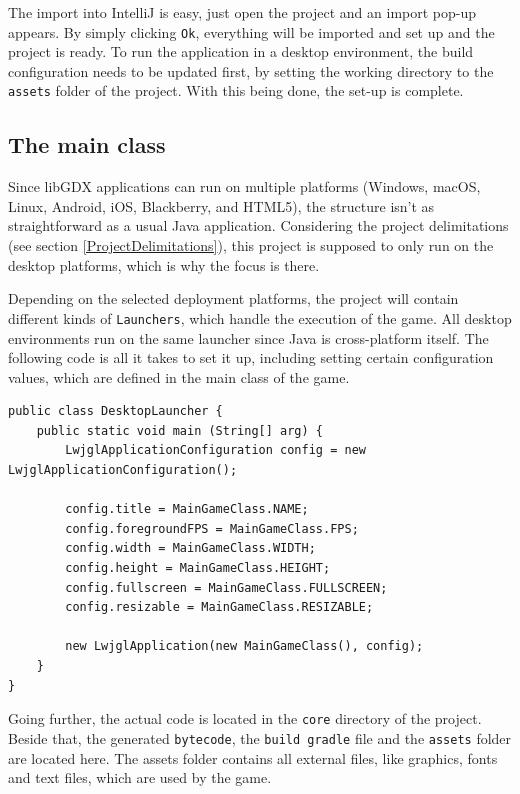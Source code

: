 \documentclass[12p]{article}
\begin{document}
The import into IntelliJ is easy, just open the project and an import pop-up appears. By simply clicking \texttt{Ok}, everything will be imported and set up and the project is ready. To run the application in a desktop environment, the build configuration needs to be updated first, by setting the working directory to the \texttt{assets} folder of the project. With this being done, the set-up is complete.


\subsection{The main class} \label{DocMainClass}

Since libGDX applications can run on multiple platforms (Windows, macOS, Linux, Android, iOS, Blackberry, and HTML5), the structure isn't as straightforward as a usual Java application. Considering the project delimitations (see section \ref{ProjectDelimitations}), this project is supposed to only run on the desktop platforms, which is why the focus is there.

Depending on the selected deployment platforms, the project will contain different kinds of \texttt{Launchers}, which handle the execution of the game. All desktop environments run on the same launcher since Java is cross-platform itself. The following code is all it takes to set it up, including setting certain configuration values, which are defined in the main class of the game.

\begin{verbatim}
public class DesktopLauncher {
	public static void main (String[] arg) {
		LwjglApplicationConfiguration config = new LwjglApplicationConfiguration();

		config.title = MainGameClass.NAME;
		config.foregroundFPS = MainGameClass.FPS;
		config.width = MainGameClass.WIDTH;
		config.height = MainGameClass.HEIGHT;
		config.fullscreen = MainGameClass.FULLSCREEN;
		config.resizable = MainGameClass.RESIZABLE;

		new LwjglApplication(new MainGameClass(), config);
	}
}
\end{verbatim}

Going further, the actual code is located in the \texttt{core} directory of the project. Beside that, the generated \texttt{bytecode}, the \texttt{build gradle} file and the \texttt{assets} folder are located here. The assets folder contains all external files, like graphics, fonts and text files, which are used by the game.
\end{document}
